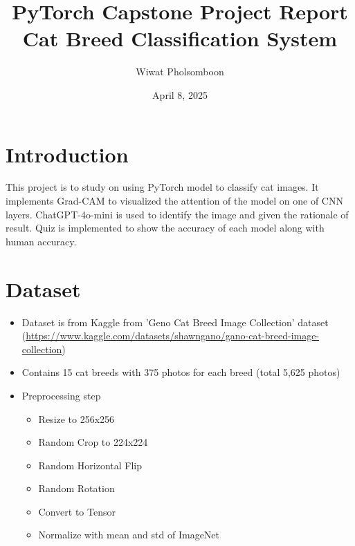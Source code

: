 \documentclass{article}
\title{\textcolor{maincolor}{\Huge PyTorch Capstone Project Report}\\
\textcolor{secondcolor}{\Large Cat Breed Classification System}}
\author{\textcolor{secondcolor}{Wiwat Pholsomboon}}
\date{\textcolor{secondcolor}{April 8, 2025}}
\begin{document}
\maketitle

\section{Introduction}
This project is to study on using PyTorch model to classify cat images. It implements Grad-CAM to visualized the attention of the model on one of CNN layers. ChatGPT-4o-mini is used to identify the image and given the rationale of result. Quiz is implemented to show the accuracy of each model along with human accuracy.

\section{Dataset}
\begin{itemize}
    \item Dataset is from Kaggle from 'Geno Cat Breed Image Collection' dataset (\url{https://www.kaggle.com/datasets/shawngano/gano-cat-breed-image-collection})
    \item Contains 15 cat breeds with 375 photos for each breed (total 5,625 photos)
    \item Preprocessing step
    \begin{itemize}
        \item Resize to 256x256
        \item Random Crop to 224x224
        \item Random Horizontal Flip
        \item Random Rotation
        \item Convert to Tensor
        \item Normalize with mean and std of ImageNet
    \end{itemize}
\end{itemize}
\end{document}
